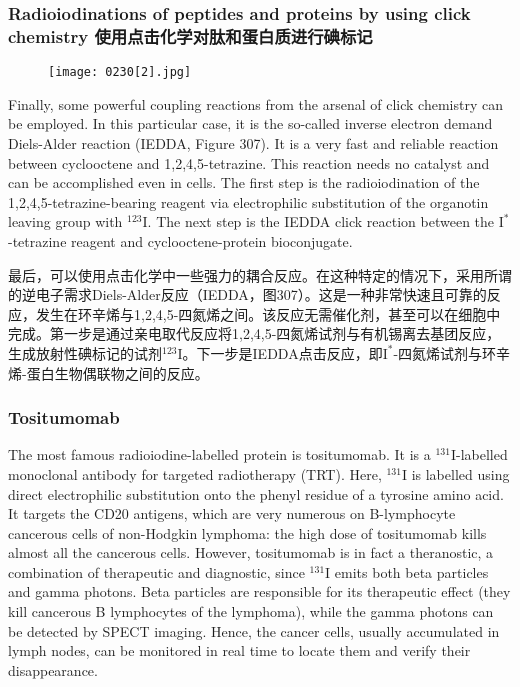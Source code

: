 \documentclass[dvipsnames, svgnames,a4paper,11pt]{article}
\begin{document}
\subsubsection{Radioiodinations of peptides and proteins by using click chemistry 使用点击化学对肽和蛋白质进行碘标记}

\begin{figure}[h]
	\centering
    \texttt{[image: 0230[2].jpg]}  
     \label{fig307}
\end{figure}
Finally, some powerful coupling reactions from the arsenal of click chemistry can be employed. In this particular case, it is the so-called inverse electron demand Diels-Alder reaction (IEDDA, Figure 307). It is a very fast and reliable reaction between cyclooctene and 1,2,4,5-tetrazine. This reaction needs no catalyst and can be accomplished even in cells. The first step is the radioiodination of the 1,2,4,5-tetrazine-bearing reagent via electrophilic substitution of the organotin leaving group with \(\mathrm{^{123}I}\). The next step is the IEDDA click reaction between the \(\mathrm{I^{*}}\)-tetrazine reagent and cyclooctene-protein bioconjugate.

最后，可以使用点击化学中一些强力的耦合反应。在这种特定的情况下，采用所谓的逆电子需求Diels-Alder反应（IEDDA，图307）。这是一种非常快速且可靠的反应，发生在环辛烯与1,2,4,5-四氮烯之间。该反应无需催化剂，甚至可以在细胞中完成。第一步是通过亲电取代反应将1,2,4,5-四氮烯试剂与有机锡离去基团反应，生成放射性碘标记的试剂\(\mathrm{^{123}I}\)。下一步是IEDDA点击反应，即\(\mathrm{I^{*}}\)-四氮烯试剂与环辛烯-蛋白生物偶联物之间的反应。



\subsubsection{Tositumomab}  
The most famous radioiodine-labelled protein is tositumomab. It is a \(\mathrm{^{131}I}\)-labelled monoclonal antibody for targeted radiotherapy (TRT). Here, \(\mathrm{^{131}I}\) is labelled using direct electrophilic substitution onto the phenyl residue of a tyrosine amino acid. It targets the CD20 antigens, which are very numerous on B-lymphocyte cancerous cells of non-Hodgkin lymphoma: the high dose of tositumomab kills almost all the cancerous cells. However, tositumomab is in fact a theranostic, a combination of therapeutic and diagnostic, since \(\mathrm{^{131}I}\) emits both beta particles and gamma photons. Beta particles are responsible for its therapeutic effect (they kill cancerous B lymphocytes of the lymphoma), while the gamma photons can be detected by SPECT imaging. Hence, the cancer cells, usually accumulated in lymph nodes, can be monitored in real time to locate them and verify their disappearance.
\end{document}
